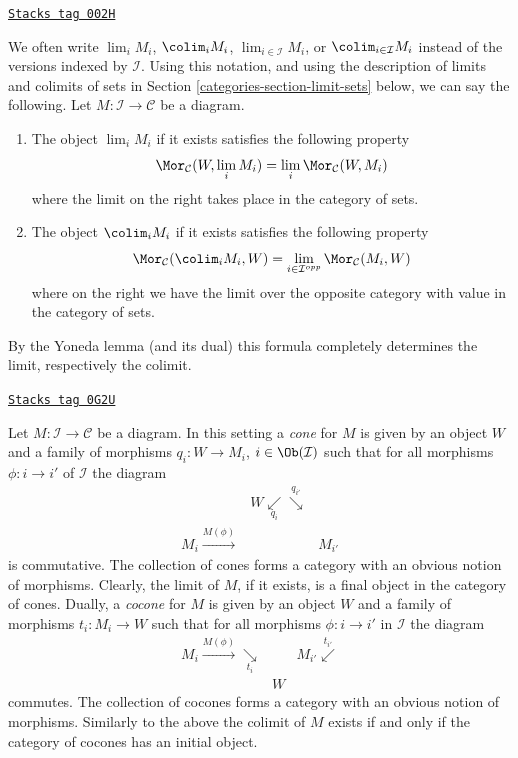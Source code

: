 \begin{remark}
\label{categories-remark-limit-colim}
\href{https://stacks.math.columbia.edu/tag/002H}{\texttt{Stacks tag 002H}}

We often write $\lim_i M_i$, $\colim_i M_i$,
$\lim_{i\in \mathcal{I}} M_i$, or $\colim_{i\in \mathcal{I}} M_i$
instead of the versions indexed by $\mathcal{I}$.
Using this notation, and using the description of
limits and colimits of sets in Section \ref{categories-section-limit-sets}
below, we can say the following.
Let $M : \mathcal{I} \to \mathcal{C}$ be a diagram.
\begin{enumerate}
\item The object $\lim_i M_i$ if it exists satisfies the following property
$$
\Mor_\mathcal{C}(W, \lim_i M_i)
=
\lim_i \Mor_\mathcal{C}(W, M_i)
$$
where the limit on the right takes place in the category of sets.
\item The object $\colim_i M_i$ if it
exists satisfies the following property
$$
\Mor_\mathcal{C}(\colim_i M_i, W)
=
\lim_{i \in \mathcal{I}^{opp}} \Mor_\mathcal{C}(M_i, W)
$$
where on the right we have the limit over the opposite category
with value in the category of sets.
\end{enumerate}
By the Yoneda lemma (and its dual) this formula completely determines the
limit, respectively the colimit.
\end{remark}

\begin{remark}
\label{categories-remark-cones-and-cocones}
\href{https://stacks.math.columbia.edu/tag/0G2U}{\texttt{Stacks tag 0G2U}}

Let $M : \mathcal{I} \to \mathcal{C}$ be a diagram. In this setting a
{\it cone} for $M$ is given by an object $W$ and a family of morphisms
$q_i : W \to M_i$, $i \in \Ob(\mathcal{I})$ such that for all morphisms
$\phi : i \to i'$ of $\mathcal{I}$ the diagram
$$
\begin{array}{ccc} & W \underset{q_i}{\swarrow}\overset{q_{i'}}{\searrow} &  \\ M_i \overset{M(\phi)}{\longrightarrow} &  & M_{i'}\end{array}
$$
is commutative. The collection of cones forms a category with an obvious
notion of morphisms. Clearly, the limit of $M$, if it exists, is a final
object in the category of cones. Dually, a {\it cocone} for $M$ is given
by an object $W$ and a family of morphisms $t_i : M_i \to W$ such that for
all morphisms $\phi : i \to i'$ in $\mathcal{I}$ the diagram
$$
\begin{array}{ccc}M_i \overset{M(\phi)}{\longrightarrow}\underset{t_i}{\searrow} &  & M_{i'} \overset{t_{i'}}{\swarrow} \\  & W & \end{array}
$$
commutes. The collection of cocones forms a category with an obvious notion
of morphisms. Similarly to the above the colimit of $M$ exists
if and only if the category of cocones has an initial object.
\end{remark}

